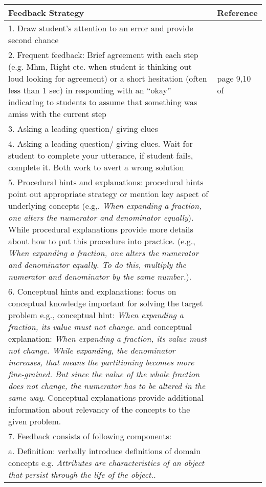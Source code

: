\begin{longtable}{ | m{30em} | m{2cm}|  } 
\hline
\textbf{Feedback Strategy} & \textbf{Reference}  \\ 
\hline
1. Draw student’s attention to an error and provide second chance & \parencite{lepper1990self}  \\ 
\hline
2. Frequent feedback: Brief agreement with each step (e.g. Mhm, Right etc. when student is thinking out loud looking for agreement) or a short hesitation (often less than 1 sec) in responding with an “okay” indicating to students to assume that something was amiss with the current step & page 9,10 of \parencite{fox1991cognitive}  \\ 
\hline
3. Asking a leading question/ giving clues & \parencite{fox1991cognitive}\\
\hline
4. Asking a leading question/ giving clues.  Wait for student to complete your utterance, if student fails, complete it. Both work to avert a wrong solution & \parencite{lepper1990self}\\
\hline
5. Procedural hints and explanations: procedural hints point out appropriate strategy or mention key aspect of underlying concepts (e.g,. \emph{When expanding a fraction, one alters the numerator and denominator equally}). While procedural explanations provide more details about how to put this procedure into practice. (e.g., \emph{When expanding a fraction, one alters the numerator and denominator equally. To do this, multiply the numerator and denominator by the same number.}). & \parencite{narciss2014exploring}\\
\hline
6. Conceptual hints and explanations: focus on conceptual knowledge important for solving the target problem e.g., conceptual hint: \emph{When expanding a fraction, its value must not change.} and conceptual explanation: \emph{When expanding a fraction, its value must not change. While expanding, the denominator increases, that means the partitioning becomes more fine-grained. But since the value of the whole fraction does not change, the numerator has to be altered in the same way}. Conceptual explanations provide additional information about relevancy of the concepts to the given problem. & \parencite{narciss2014exploring} \\
\hline
7. Feedback consists of following components: & \parencite{parvez2008individualizing}\\
a. Definition: verbally introduce definitions of domain concepts e.g. \emph{Attributes are characteristics of an object that persist through the life of the object.}. & \\

\end{longtable}
